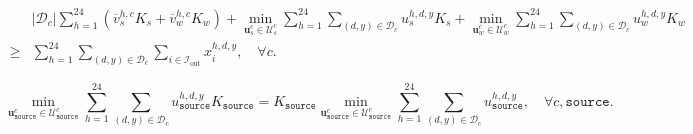 \documentclass[10pt,a4paper]{amsart}
\begin{document}
\begin{align}\label{eq:aggregation_wc}
    & |\mathcal{D}_c|\sum_{h=1}^{24} \left( \overline{v}_s^{h,c}  K_s +  \overline{v}_w^{h,c} K_w \right) + \min_{\boldsymbol{u}_s^c \in \mathcal{U}_s^{c}} \sum_{h=1}^{24}\sum_{(d, y)\in \mathcal{D}_c} u_s^{h,d,y} K_s + \min_{\boldsymbol{u}_w^c \in \mathcal{U}_w^{c}} \sum_{h=1}^{24}\sum_{(d, y)\in \mathcal{D}_c} u_w^{h,d,y} K_w \nonumber \\ \ge&\sum_{h=1}^{24}\sum_{(d,y)\in \mathcal{D}_c} \sum_{i \in \mathcal{I}_\text{out}} x_{i}^{h,d,y} , \quad \forall c.
\end{align}

\begin{equation}\label{eq:rearrange}
    \min_{{\boldsymbol{u}}^{c}_\texttt{source} \in \mathcal{U}_\texttt{source}^{c}}
    \sum_{h=1}^{24}\sum_{(d,y)\in\mathcal{D}_c}
    u_\texttt{source}^{h,d,y} K_\texttt{source}
    =
    K_\texttt{source}
    \min_{\boldsymbol{u}^{c}_\texttt{source}\in\mathcal{U}_\texttt{source}^{c}}
    \sum_{h=1}^{24}\sum_{(d,y)\in\mathcal{D}_c}
    u_\texttt{source}^{h,d,y},
    \quad \forall c,\texttt{source}.
\end{equation}
\end{document}

